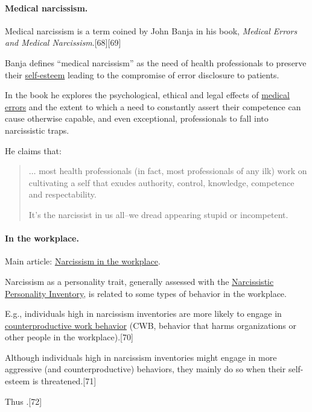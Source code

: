 \documentclass[oneside]{book}
\numberwithin{equation}{section}
\begin{document}
\paragraph{Medical narcissism.} Medical narcissism is a term coined by John Banja in his book, \textit{Medical Errors and Medical Narcissism}.[68][69]

Banja defines ``medical narcissism'' as the need of health professionals to preserve their \href{https://en.wikipedia.org/wiki/Self-esteem}{self-esteem} leading to the compromise of error disclosure to patients.

In the book he explores the psychological, ethical and legal effects of \href{https://en.wikipedia.org/wiki/Medical_error}{medical errors} and the extent to which a need to constantly assert their competence can cause otherwise capable, and even exceptional, professionals to fall into narcissistic traps.

He claims that:
\begin{quotation}
    $\ldots$ most health professionals (in fact, most professionals of any ilk) work on cultivating a self that exudes authority, control, knowledge, competence and respectability.
    
    It's the narcissist in us all--we dread appearing stupid or incompetent.
\end{quotation}

\paragraph{In the workplace.} Main article: \href{https://en.wikipedia.org/wiki/Narcissism_in_the_workplace}{Narcissism in the workplace}.

Narcissism as a personality trait, generally assessed with the \href{https://en.wikipedia.org/wiki/Narcissistic_Personality_Inventory}{Narcissistic Personality Inventory}, is related to some types of behavior in the workplace.

E.g., individuals high in narcissism inventories are more likely to engage in \href{https://en.wikipedia.org/wiki/Counterproductive_work_behavior}{counterproductive work behavior} (CWB, behavior that harms organizations or other people in the workplace).[70]

Although individuals high in narcissism inventories might engage in more aggressive (and counterproductive) behaviors, they mainly do so when their self-esteem is threatened.[71]

Thus .[72]
\end{document}
